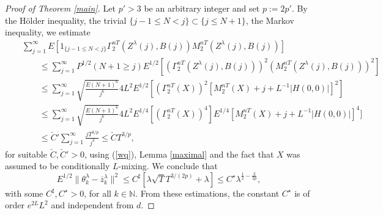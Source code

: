 \documentclass[a4paper]{article}
\begin{document}
\begin{proof}[ Proof of Theorem \ref{main}]
 Let $p'>3$ be an arbitrary integer and set $p:=2p'$.
By the H\"older inequality, the trivial $\{j-1\leq N < j\} \subset \{j\leq N+1\}$, the Markov inequality, we estimate 
\begin{eqnarray*}
&&\sum_{j=1}^{\infty}E[1_{\{j-1\leq N <j\}}
	\Gamma_2^{nT}(Z^{\lambda}(j),B(j))M_2^{nT}(Z^{\lambda}(j),B(j))] \\
&& \qquad \leq	\sum_{j=1}^{\infty} P^{1/2}(N+1\geq j)
	E^{1/2}[(\Gamma_2^{nT}(Z^{\lambda}(j),B(j)))^2(M_2^{nT}(Z^{\lambda}(j),B(j)))^2]\\
&& \qquad \leq	\sum_{j=1}^{\infty}\sqrt{\frac{E(N+1)^6}{j^6}}4L^2  E^{1/2}[(\Gamma^{nT}_2(X))^2  [M_2^{nT}(X)+j+L^{-1}|H(0,0)|]^2] \\
&& \qquad \leq	\sum_{j=1}^{\infty}\sqrt{\frac{E(N+1)^6}{j^6}}4L^2 
	E^{1/4}[(\Gamma^{nT}_2(X))^4]
	E^{1/4}[M_2^{nT}(X)+j+L^{-1}|H(0,0)|]^4] \\
&& \qquad \leq	\check{C}'\sum_{j=1}^{\infty} \frac{jT^{3/p}}{j^3}
		\leq \check{C}T^{3/p},
\end{eqnarray*}
for suitable $\check{C}, \check{C}'>0$, using (\ref{wq}), Lemma \ref{maximal}
and the fact that $X$ was assumed
to be conditionally $L$-mixing.  We conclude that
$$
E^{1/2}\| \theta^{\lambda}_{k}-\overline{z}_{k}^{\lambda}\|^2\leq C^{\sharp}[\lambda \sqrt{T}
	T^{3/(2p)}+\lambda]\leq C^{\star}\lambda^{\frac{1}{2} - \frac{3}{2p}},
$$
with some $C^{\sharp},C^{\star}>0$, for all $k\in\mathbb{N}$. From these estimations, the constant $C^{\star}$ is of order $e^{2L}L^2$ and independent from $d$. 


\end{proof}
\end{document}
